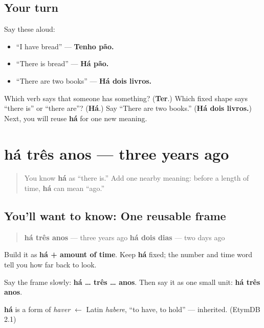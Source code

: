 \subsection*{Your turn}
Say these aloud:

\begin{itemize}
\raggedright
  \item “I have bread” — \textbf{Tenho pão.}
  \item “There is bread” — \textbf{Há pão.}
  \item “There are two books” — \textbf{Há dois livros.}
\end{itemize}

\begin{tcolorbox}[breakable,colback=teal!4,colframe=teal!35!black,title={Before you move on}]
Which verb says that someone has something? (\textbf{Ter}.) Which fixed shape says “there is” or “there are”? (\textbf{Há}.) Say “There are two books.” (\textbf{Há dois livros.}) Next, you will reuse \textbf{há} for one new meaning.
\end{tcolorbox}
\section[há três anos]{há três anos — three years ago}

\label{lesson:PT-C18-ha-time-ago}



\begin{quote}
You know \textbf{há} as “there is.” Add one nearby meaning: before a length of time, \textbf{há} can mean “ago.”
\end{quote}

\subsection*{You'll want to know: One reusable frame}
\begin{quote}
\textbf{há três anos} — three years ago \textbf{há dois dias} — two days ago
\end{quote}

Build it as \textbf{há + amount of time}. Keep \textbf{há} fixed; the number and time word tell you how far back to look.

Say the frame slowly: \textbf{há … três … anos}. Then say it as one small unit: \textbf{há três anos}.

\begin{cousinweb}
\textbf{há} is a form of \emph{haver} $\leftarrow$ Latin \emph{habere}, \textquotedblleft{}to have, to hold\textquotedblright{} — inherited. (EtymDB 2.1)
\end{cousinweb}

